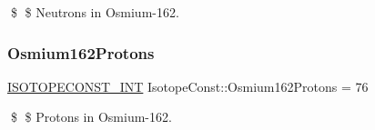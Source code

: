 \$ \$ Neutrons in Osmium-\/162. \mbox{\label{group___isotope_const-_osmium-_os162_gacdf8e6395f4110e63c4222e18e7950b1}} 
\subsubsection{\texorpdfstring{Osmium162\+Protons}{Osmium162Protons}}
{\footnotesize\ttfamily \mbox{\hyperlink{group___isotope_const-_macros_ga5f18360b3e99483a35c32d789e62621c}{I\+S\+O\+T\+O\+P\+E\+C\+O\+N\+S\+T\+\_\+\+I\+NT}} Isotope\+Const\+::\+Osmium162\+Protons = 76}

\$ \$ Protons in Osmium-\/162. 
